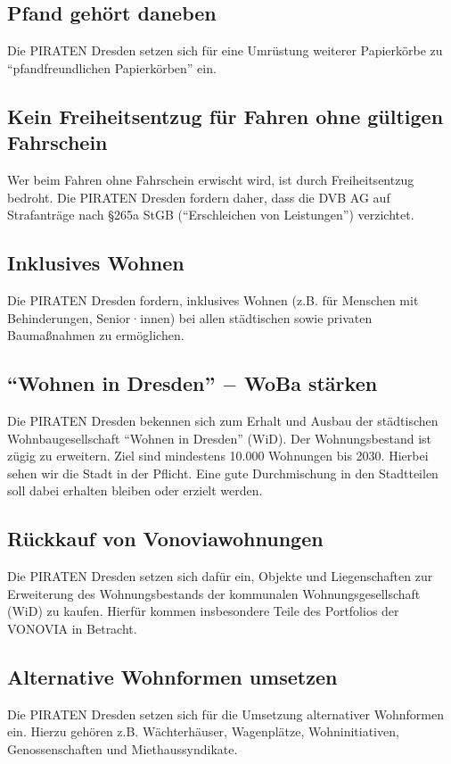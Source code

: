 \documentclass[a4paper, 11pt]{article}
\begin{document}
\subsection{Pfand gehört daneben}
Die PIRATEN Dresden setzen sich für eine Umrüstung weiterer Papierkörbe zu ``pfandfreundlichen Papierkörben'' ein.


\subsection{Kein Freiheitsentzug für Fahren ohne gültigen Fahrschein}
Wer beim Fahren ohne Fahrschein erwischt wird, ist durch Freiheitsentzug bedroht. Die PIRATEN Dresden fordern daher, dass die DVB AG auf Strafanträge nach §265a StGB (``Erschleichen von Leistungen'') verzichtet.


\subsection{Inklusives Wohnen}
Die PIRATEN Dresden fordern, inklusives Wohnen (z.B. für Menschen mit Behinderungen, Senior·innen) bei allen städtischen sowie privaten Baumaßnahmen zu ermöglichen.


\subsection{``Wohnen in Dresden'' $-$ WoBa stärken}
Die PIRATEN Dresden bekennen sich zum Erhalt und Ausbau der städtischen Wohnbaugesellschaft ``Wohnen in Dresden'' (WiD). Der Wohnungsbestand ist zügig zu erweitern. Ziel sind mindestens 10.000 Wohnungen bis 2030. Hierbei sehen wir die Stadt in der Pflicht. Eine gute Durchmischung in den Stadtteilen soll dabei erhalten bleiben oder erzielt werden.


\subsection{Rückkauf von Vonoviawohnungen}
Die PIRATEN Dresden setzen sich dafür ein, Objekte und Liegenschaften zur Erweiterung des Wohnungsbestands der kommunalen Wohnungsgesellschaft (WiD) zu kaufen. Hierfür kommen insbesondere Teile des Portfolios der VONOVIA in Betracht.


\subsection{Alternative Wohnformen umsetzen}
Die PIRATEN Dresden setzen sich für die Umsetzung alternativer Wohnformen ein. Hierzu gehören z.B. Wächterhäuser, Wagenplätze, Wohninitiativen, Genossenschaften und Miethaussyndikate.
\end{document}
